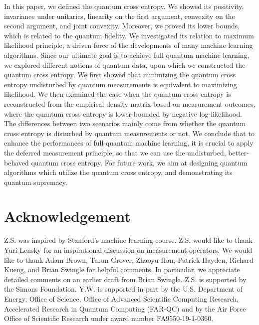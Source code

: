 \documentclass[11pt]{article}
\theoremstyle{definition}
\begin{document}
In this paper, we defined the quantum cross entropy. We showed its positivity, invariance under unitaries, linearity on the first argument, convexity on the second argument, and joint convexity. Moreover, we proved its lower bounds, which is related to the quantum fidelity. We investigated its relation to maximum likelihood principle, a driven force of the developments of many machine learning algorithms. Since our ultimate goal is to achieve full quantum machine learning, we explored different notions of quantum data, upon which we constructed the quantum cross entropy.
We first showed that minimizing the quantum cross entropy undisturbed by quantum measurements is equivalent to maximizing likelihood. We then examined the case when the quantum cross entropy is reconstructed from the empirical density matrix based on measurement outcomes, where the quantum cross entropy is lower-bounded by negative log-likelihood. The differences between two scenarios mainly come from whether the quantum cross entropy is disturbed by quantum measurements or not. We conclude that to enhance the performances of full quantum machine learning, it is crucial to apply the deferred measurement principle, so that we can use the undisturbed, better-behaved quantum cross entropy. For future work, we aim at designing quantum algorithms which utilize the quantum cross entropy, and demonstrating its quantum supremacy.








\section*{Acknowledgement}
Z.S. was inspired by Stanford's machine learning course. Z.S. would like to thank Yuri Lensky for an inspirational discussion on measurement operators. We would like to thank Adam Brown, Tarun Grover, Zhaoyu Han, Patrick Hayden, Richard Kueng, and Brian Swingle for helpful comments. In particular, we appreciate detailed comments on an earlier draft from Brian Swingle. Z.S. is supported by the Simons Foundation. Y.W. is supported in part by the U.S. Department of Energy, Office of Science, Office of Advanced Scientific Computing Research, Accelerated Research in Quantum Computing (FAR-QC) and by the Air Force Office of Scientific Research under award number FA9550-19-1-0360.
\end{document}
